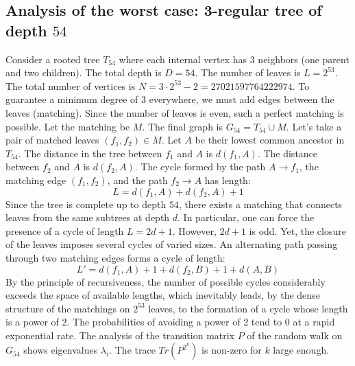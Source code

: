 \documentclass[12pt,a4paper]{article}
\begin{document}
\subsection{Analysis of the worst case: 3-regular tree of depth $54$}
Consider a rooted tree $T_{54}$ where each internal vertex has 3 neighbors (one parent and two children).
The total depth is $D = 54$.
The number of leaves is $L = 2^{53}$.
The total number of vertices is $N = 3 \cdot 2^{53} - 2 = 27021597764222974$.
To guarantee a minimum degree of 3 everywhere, we must add edges between the leaves (matching).
Since the number of leaves is even, such a perfect matching is possible.
Let the matching be $M$. The final graph is $G_{54} = T_{54} \cup M$.
Let's take a pair of matched leaves $(f_1, f_2) \in M$.
Let $A$ be their lowest common ancestor in $T_{54}$.
The distance in the tree between $f_1$ and $A$ is $d(f_1, A)$.
The distance between $f_2$ and $A$ is $d(f_2, A)$.
The cycle formed by the path $A \to f_1$, the matching edge $(f_1, f_2)$, and the path $f_2 \to A$ has length:
$$ L = d(f_1, A) + d(f_2, A) + 1 $$
Since the tree is complete up to depth $54$, there exists a matching that connects leaves from the same subtrees at depth $d$.
In particular, one can force the presence of a cycle of length $L = 2d + 1$. However, $2d+1$ is odd.
Yet, the closure of the leaves imposes several cycles of varied sizes. An alternating path passing through two matching edges forms a cycle of length:
$$ L' = d(f_1, A) + 1 + d(f_2, B) + 1 + d(A, B) $$
By the principle of recursiveness, the number of possible cycles considerably exceeds the space of available lengths, which inevitably leads, by the dense structure of the matchings on $2^{53}$ leaves, to the formation of a cycle whose length is a power of 2. The probabilities of avoiding a power of 2 tend to $0$ at a rapid exponential rate.
The analysis of the transition matrix $P$ of the random walk on $G_{54}$ shows eigenvalues $\lambda_i$. The trace $Tr(P^{2^k})$ is non-zero for $k$ large enough.
\end{document}
